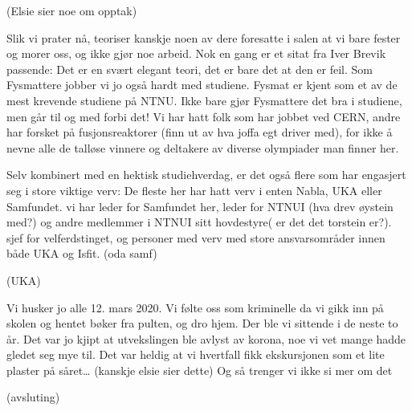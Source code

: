 \documentclass[16pt, a4paper]{article}
\begin{document}
(Elsie sier noe om opptak)

Slik vi prater nå, teoriser kanskje noen av dere foresatte i salen at vi bare fester og morer oss, og ikke gjør noe arbeid.
Nok en gang er et sitat fra Iver Brevik passende:
Det er en svært elegant teori, det er bare det at den er feil.
Som Fysmattere jobber vi jo også hardt med studiene.
Fysmat er kjent som et av de mest krevende studiene på NTNU.
Ikke bare gjør Fysmattere det bra i studiene, men går til og med forbi det!
Vi har hatt folk som har jobbet ved CERN, andre har forsket på fusjonsreaktorer (finn ut av hva joffa egt driver med), for ikke å nevne alle de talløse vinnere og deltakere av diverse olympiader man finner her.

Selv kombinert med en hektisk studiehverdag, er det også flere som har engasjert seg i store viktige verv:
De fleste her har hatt verv i enten Nabla, UKA eller Samfundet.
vi har leder for Samfundet her, leder for NTNUI (hva drev øystein med?) og andre medlemmer i NTNUI sitt hovdestyre( er det det torstein er?). sjef for velferdstinget, og personer med verv med store ansvarsområder innen både UKA og Isfit.
(oda samf)

(UKA)

Vi husker jo alle 12. mars 2020.
Vi følte oss som kriminelle da vi gikk inn på skolen og hentet bøker fra pulten, og dro hjem.
Der ble vi sittende i de neste to år.
Det var jo kjipt at utvekslingen ble avlyst av korona, noe vi vet mange hadde gledet seg mye til.
Det var heldig at vi hvertfall fikk ekskursjonen som et lite plaster på såret\ldots{} (kanskje elsie sier dette)
Og så trenger vi ikke si mer om det

(avsluting)
\end{document}
